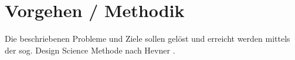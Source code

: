 \section{Vorgehen / Methodik}

Die beschriebenen Probleme und Ziele sollen gelöst und erreicht werden mittels der sog. Design Science Methode nach Hevner \citep{Hevner2004}.

\newpage
